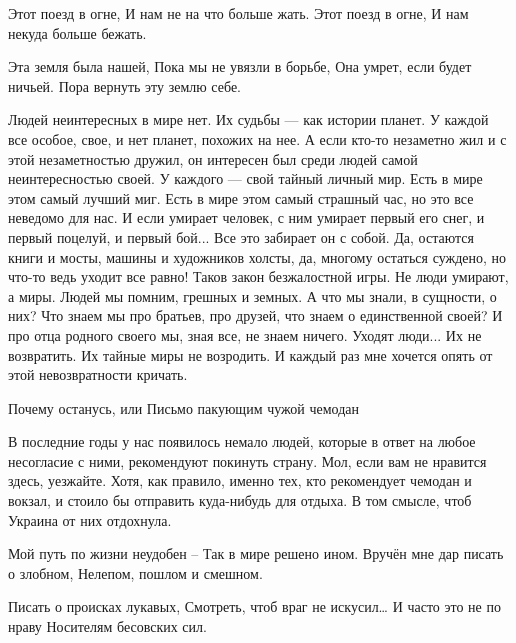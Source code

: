  
 
 
 
 


Этот поезд в огне,
И нам не на что больше жать.
Этот поезд в огне,
И нам некуда больше бежать.

Эта земля была нашей,
Пока мы не увязли в борьбе,
Она умрет, если будет ничьей.
Пора вернуть эту землю себе.


Людей неинтересных в мире нет.
Их судьбы — как истории планет.
У каждой все особое, свое,
и нет планет, похожих на нее.
А если кто-то незаметно жил
и с этой незаметностью дружил,
он интересен был среди людей
самой неинтересностью своей.
У каждого — свой тайный личный мир.
Есть в мире этом самый лучший миг.
Есть в мире этом самый страшный час,
но это все неведомо для нас.
И если умирает человек,
с ним умирает первый его снег,
и первый поцелуй, и первый бой...
Все это забирает он с собой.
Да, остаются книги и мосты,
машины и художников холсты,
да, многому остаться суждено,
но что-то ведь уходит все равно!
Таков закон безжалостной игры.
Не люди умирают, а миры.
Людей мы помним, грешных и земных.
А что мы знали, в сущности, о них?
Что знаем мы про братьев, про друзей,
что знаем о единственной своей?
И про отца родного своего
мы, зная все, не знаем ничего.
Уходят люди... Их не возвратить.
Их тайные миры не возродить.
И каждый раз мне хочется опять
от этой невозвратности кричать.

Почему останусь, или Письмо пакующим чужой чемодан

В последние годы у нас появилось немало людей, которые в ответ на любое
несогласие с ними, рекомендуют покинуть страну. Мол, если вам не нравится
здесь, уезжайте. Хотя, как правило, именно тех, кто рекомендует чемодан и
вокзал, и стоило бы отправить куда-нибудь для отдыха. В том смысле, чтоб
Украина от них отдохнула.

Мой путь по жизни неудобен – 
Так в мире решено ином.
Вручён мне дар писать о злобном,
Нелепом, пошлом и смешном.

Писать о происках лукавых,
Смотреть, чтоб враг не искусил…
И часто это не по нраву
Носителям бесовских сил.

